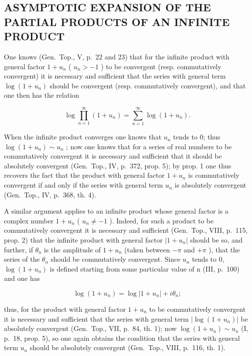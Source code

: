 \subsection{ASYMPTOTIC EXPANSION OF THE PARTIAL PRODUCTS OF AN INFINITE PRODUCT}

One knows (Gen.~Top., V, p.~22 and 23) that for the infinite product with general factor \(1 + u_{n}\) ( \(u_{n} > -1\) ) to be convergent (resp. commutatively convergent) it is necessary and sufficient that the series with general term \(\log(1 + u_{n})\) should be convergent (resp. commutatively convergent), and that one then has the relation

\[
\log \prod_ {n = 1} ^ {\infty} (1 + u _ {n}) = \sum_ {n = 1} ^ {\infty} \log (1 + u _ {n}).
\]

When the infinite product converges one knows that \(u_{n}\) tends to 0; thus \(\log(1 + u_{n}) \sim u_{n}\) ; now one knows that for a series of real numbers to be commutatively convergent it is necessary and sufficient that it should be absolutely convergent (Gen.~Top., IV, p.~372, prop. 5); by prop. 1 one thus recovers the fact that the product with general factor \(1 + u_{n}\) is commutatively convergent if and only if the series with general term \(u_{n}\) is absolutely convergent (Gen.~Top., IV, p.~368, th. 4).

A similar argument applies to an infinite product whose general factor is a complex number \(1 + u_{n}\) ( \(u_{n} \neq -1\) ). Indeed, for such a product to be commutatively convergent it is necessary and sufficient (Gen.~Top., VIII, p.~115, prop. 2) that the infinite product with general factor \(|1 + u_{n}|\) should be so, and further, if \(\theta_{n}\) is the amplitude of \(1 + u_{n}\) (taken between \(-\pi\) and \(+\pi\) ), that the series of the \(\theta_{n}\) should be commutatively convergent. Since \(u_{n}\) tends to 0, \(\log(1 + u_{n})\) is defined starting from some particular value of n (III, p.~100) and one has

\[
\log (1 + u _ {n}) = \log | 1 + u _ {n} | + i \theta_ {n};
\]

thus, for the product with general factor \(1 + u_{n}\) to be commutatively convergent it is necessary and sufficient that the series with general term \(|\log(1 + u_{n})|\) be absolutely convergent (Gen.~Top., VII, p.~84, th. 1); now \(\log(1 + u_{n}) \sim u_{n}\) (I, p.~18, prop. 5), so one again obtains the condition that the series with general term \(u_{n}\) should be absolutely convergent (Gen.~Top., VIII, p.~116, th. 1).

